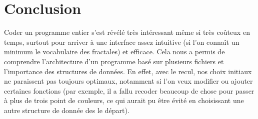\documentclass[a4paper,11pt]{article} \usepackage[T1]{fontenc} \usepackage[utf8]{inputenc} \usepackage[francais]{babel}
\begin{document}
\section{Conclusion}
Coder un programme entier s'est révélé très intéressant même si très coûteux en temps, surtout pour arriver à une interface assez intuitive (si l'on connaît un minimum le vocabulaire des fractales) et efficace.
Cela nous a permis de comprendre l'architecture d'un programme basé sur plusieurs fichiers et l'importance des structures de données. En effet, avec le recul, nos choix initiaux ne paraissent pas toujours optimaux, notamment si l'on veux modifier ou ajouter certaines fonctions (par exemple, il a fallu recoder beaucoup de chose pour passer à plus de trois point de couleurs, ce qui aurait pu être évité en choisissant une autre structure de donnée des le départ).
\end{document}
